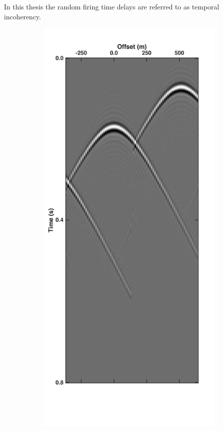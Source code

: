 In this thesis the random firing time delays are referred to as temporal incoherency.  

\begin{figure}
	\centering
	\begin{subfigure}[b]{0.3\textwidth}
		\centering
		\includegraphics[width = \textwidth]{Plots/Mahdad/25iter/TimeDelay/Pseudo-DeblendedCRG_rec30_coh}

\end{subfigure}
\end{figure}
